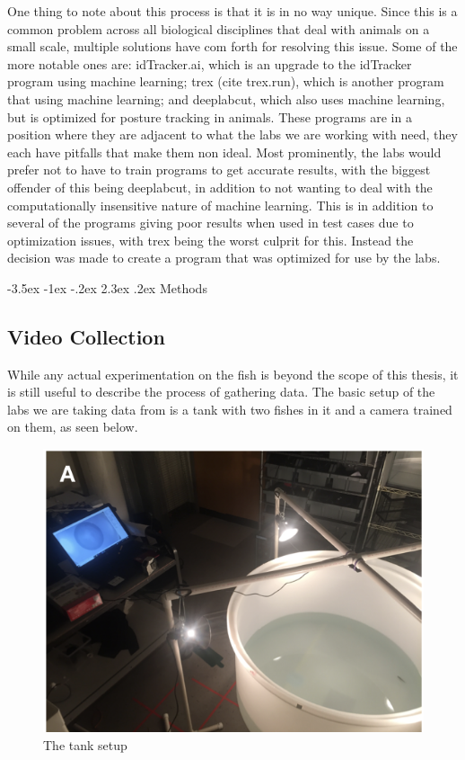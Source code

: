 \documentclass{article}
\makeatletter
\renewcommand\section{\clearpage\newpage\@startsection {section}{1}{\z@}%
	{-3.5ex \@plus -1ex \@minus -.2ex}%
	{2.3ex \@plus.2ex}%
	{\normalfont\Large\bfseries}}
\makeatother
\begin{document}
One thing to note about this process is that it is in no way unique. Since this is a common problem across all biological disciplines that deal with animals on a small scale, multiple solutions have com forth for resolving this issue. Some of the more notable ones are: idTracker.ai, which is an upgrade to the idTracker program using machine learning; trex (cite trex.run), which is another program that using machine learning; and deeplabcut, which also uses machine learning, but is optimized for posture tracking in animals. These programs are in a position where they are adjacent to what the labs we are working with need, they each have pitfalls that make them non ideal. Most prominently, the labs would prefer not to have to train programs to get accurate results, with the biggest offender of this being deeplabcut, in addition to not wanting to deal with the computationally insensitive nature of machine learning. This is in addition to several of the programs giving poor results when used in test cases due to optimization issues, with trex being the worst culprit for this. Instead the decision was made to create a program that was optimized for use by the labs.


\section{Methods}

\subsection{Video Collection}
While any actual experimentation on the fish is beyond the scope of this thesis, it is still useful to describe the process of gathering data. The basic setup of the labs we are taking data from is a tank with two fishes in it and a camera trained on them, as seen below.

\begin{figure}[H]
	\centering
	\includegraphics[width=.5\linewidth]{experimental_design}
	\caption{The tank setup}
\end{figure}
\end{document}
